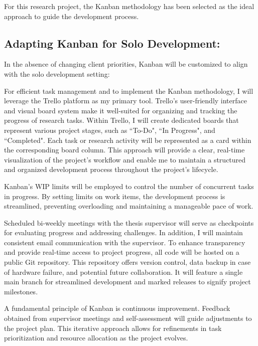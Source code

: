 For this research project, the Kanban methodology has been selected as the ideal approach to guide the development process. 

\subsection{Adapting Kanban for Solo Development:}

In the absence of changing client priorities, Kanban will be customized to align with the solo development setting:


For efficient task management and to implement the Kanban methodology, I will leverage the Trello platform as my primary tool. Trello's user-friendly interface and visual board system make it well-suited for organizing and tracking the progress of research tasks. Within Trello, I will create dedicated boards that represent various project stages, such as ``To-Do", ``In Progress", and ``Completed". Each task or research activity will be represented as a card within the corresponding board column. This approach will provide a clear, real-time visualization of the project's workflow and enable me to maintain a structured and organized development process throughout the project's lifecycle.


Kanban's WIP limits will be employed to control the number of concurrent tasks in progress. By setting limits on work items, the development process is streamlined, preventing overloading and maintaining a manageable pace of work.


Scheduled bi-weekly meetings with the thesis supervisor will serve as checkpoints for evaluating progress and addressing challenges. In addition, I will maintain consistent email communication with the supervisor. To enhance transparency and provide real-time access to project progress, all code will be hosted on a public Git repository. This repository offers version control, data backup in case of hardware failure, and potential future collaboration. It will feature a single main branch for streamlined development and marked releases to signify project milestones.

 A fundamental principle of Kanban is continuous improvement. Feedback obtained from supervisor meetings and self-assessment will guide adjustments to the project plan. This iterative approach allows for refinements in task prioritization and resource allocation as the project evolves.

